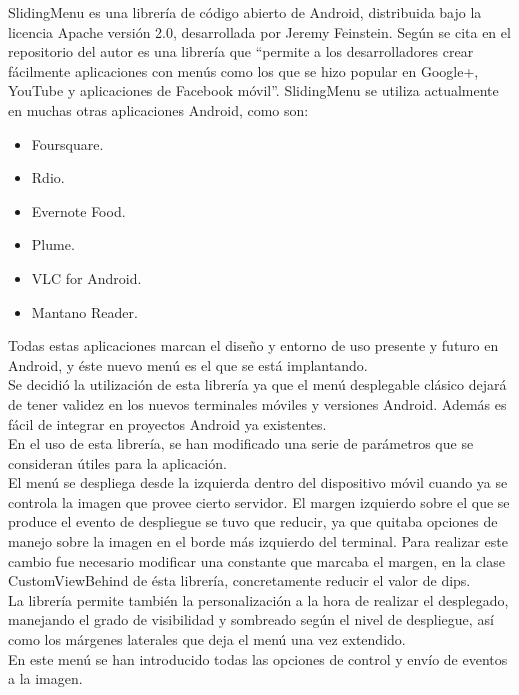 SlidingMenu\cite{slide:slide} es una librería de código abierto de Android, distribuida bajo la licencia Apache versión 2.0, desarrollada por Jeremy Feinstein. Según se cita en el repositorio del autor es una librería que “permite a los desarrolladores crear fácilmente aplicaciones con menús como los que se hizo popular en Google+, YouTube y aplicaciones de Facebook móvil”.\cite{slide:slide}
SlidingMenu se utiliza actualmente en muchas otras aplicaciones Android, como son:
\begin{itemize}
\item Foursquare.
\item Rdio.
\item Evernote Food.
\item Plume.
\item VLC for Android.
\item Mantano Reader.
\end{itemize}

Todas estas aplicaciones marcan el diseño y entorno de uso presente y futuro en Android, y éste nuevo menú es el que se está implantando.\\

Se decidió la utilización de esta librería ya que el menú desplegable clásico dejará de tener validez en los nuevos terminales móviles y versiones Android. Además es fácil de integrar en proyectos Android ya existentes.\\

En el uso de esta librería, se han modificado una serie de parámetros que se consideran útiles para la aplicación.\\

El menú se despliega desde la izquierda dentro del dispositivo móvil cuando ya se controla la imagen que provee cierto servidor. El margen izquierdo sobre el que se produce el evento de despliegue se tuvo que reducir, ya que quitaba opciones de manejo sobre la imagen en el borde más izquierdo del terminal. Para realizar este cambio fue necesario modificar una constante que marcaba el margen, en la clase CustomViewBehind de ésta librería, concretamente reducir el valor de dips. \\

La librería permite también la personalización a la hora de realizar el desplegado, manejando el grado de visibilidad y sombreado según el nivel de despliegue, así como los márgenes laterales que deja el menú una vez extendido.\\

En este menú se han introducido todas las opciones de control y envío de eventos a la imagen.\\


